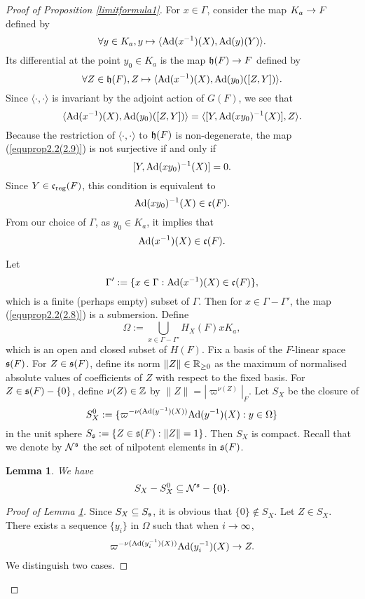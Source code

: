 \documentclass[a4paper]{amsart}
\newtheorem{lem}[thm]{Lemma}
\theoremstyle{definition}
\theoremstyle{remark}
\numberwithin{equation}{subsection}
\begin{document}
\begin{proof}[Proof of Proposition \ref{limitformula1}]
For $x\in\Gamma$, consider the map $K_a\rightarrow F$ defined by
\begin{equation}\label{equprop2.2(2.8)}
 \forall y\in K_a, y\mapsto \langle {\mathrm{Ad}}(x^{-1})(X),{\mathrm{Ad}}(y)(Y) \rangle. 
\end{equation}
Its differential at the point $y_0\in K_a$ is the map ${\mathfrak{h}}(F)\rightarrow F$ defined by
\begin{equation}\label{equprop2.2(2.9)}
 \forall Z\in {\mathfrak{h}}(F), Z\mapsto \langle {\mathrm{Ad}}(x^{-1})(X),{\mathrm{Ad}}(y_0)([Z,Y]) \rangle. 
\end{equation}
Since $\langle\cdot,\cdot\rangle$ is invariant by the adjoint action of $G(F)$, we see that
$$ \langle {\mathrm{Ad}}(x^{-1})(X),{\mathrm{Ad}}(y_0)([Z,Y]) \rangle=\langle [Y, {\mathrm{Ad}}(xy_0)^{-1}(X)] , Z \rangle. $$ 
Because the restriction of $\langle\cdot,\cdot\rangle$ to ${\mathfrak{h}}(F)$ is non-degenerate, the map (\ref{equprop2.2(2.9)}) is not surjective if and only if
$$ [Y, {\mathrm{Ad}}(xy_0)^{-1}(X)]=0. $$
Since $Y\in{\mathfrak{c}}_{\mathrm{reg}}(F)$, this condition is equivalent to
$$ {\mathrm{Ad}}(xy_0)^{-1}(X)\in{\mathfrak{c}}(F). $$
From our choice of $\Gamma$, as $y_0\in K_a$, it implies that
$$ {\mathrm{Ad}}(x^{-1})(X)\in{\mathfrak{c}}(F). $$

Let
$$ \Gamma':=\{x\in\Gamma: {\mathrm{Ad}}(x^{-1})(X)\in{\mathfrak{c}}(F)\}, $$
which is a finite (perhaps empty) subset of $\Gamma$. Then for $x\in\Gamma-\Gamma'$, the map (\ref{equprop2.2(2.8)}) is a submersion. Define
$$ \Omega:=\bigcup_{x\in\Gamma-\Gamma'} H_X(F)xK_a, $$
which is an open and closed subset of $H(F)$. 
Fix a basis of the $F$-linear space ${\mathfrak{s}}(F)$. For $Z\in{\mathfrak{s}}(F)$, define its norm $\|Z\|\in{\mathbb {R}}_{\geq0}$ as the maximum of normalised absolute values of coefficients of $Z$ with respect to the fixed basis. For $Z\in{\mathfrak{s}}(F)-\{0\}$, define $\nu(Z)\in{\mathbb {Z}}$ by $\|Z\|=|\varpi^{\nu(Z)}|_F$. 
Let $S_X$ be the closure of
$$ S_X^0:=\{\varpi^{-\nu({\mathrm{Ad}}(y^{-1})(X))}{\mathrm{Ad}}(y^{-1})(X): y\in\Omega\} $$
in the unit sphere $S_{\mathfrak{s}}:=\{Z\in{\mathfrak{s}}(F): \|Z\|=1\}$. 
Then $S_X$ is compact. Recall that we denote by ${\mathcal {N}}^{\mathfrak{s}}$ the set of nilpotent elements in ${\mathfrak{s}}(F)$. 

\begin{lem}\label{HClem7.4}
We have
$$ S_X-S_X^0\subseteq{\mathcal {N}}^{\mathfrak{s}}-\{0\}. $$
\end{lem}

\begin{proof}[Proof of Lemma \ref{HClem7.4}]
Since $S_X\subseteq S_{\mathfrak{s}}$, it is obvious that $\{0\}\notin S_X$. Let $Z\in S_X$. There exists a sequence $\{y_i\}$ in $\Omega$ such that when $i\rightarrow\infty$, 
$$ \varpi^{-\nu({\mathrm{Ad}}(y_i^{-1})(X))}{\mathrm{Ad}}(y_i^{-1})(X)\rightarrow Z. $$
We distinguish two cases. 


\end{proof}
\end{proof}
\end{document}
